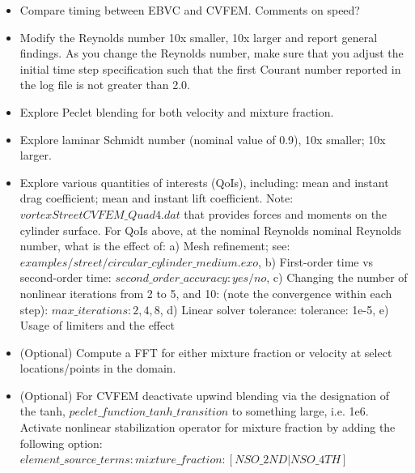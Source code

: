 \documentclass{article}
\begin{document}
\begin{itemize}
	\item Compare timing between EBVC and CVFEM. Comments on speed?
        \item Modify the Reynolds number 10x smaller, 10x larger and report general findings. 
          As you change the Reynolds number, make sure that you adjust the initial time step 
          specification such that the first Courant number reported in the log file is not greater 
          than 2.0.
        \item Explore Peclet blending for both velocity and mixture fraction.
        \item Explore laminar Schmidt number (nominal value of 0.9), 10x smaller; 10x larger.
        \item Explore various quantities of interests (QoIs), including: mean and instant drag 
          coefficient; mean and instant lift coefficient. 
        \subitem Note: $vortexStreetCVFEM\_Quad4.dat$ 
          that provides forces and moments on the cylinder surface. For QoIs above, at the nominal 
          Reynolds nominal Reynolds number, what is the effect of: a) Mesh refinement; see: 
          $examples/street/circular\_cylinder\_medium.exo$, b) First-order time vs second-order time: 
          $second\_order\_accuracy: yes/no$, c) Changing the number of nonlinear iterations from 2 to 5, 
          and 10: (note the convergence within each step): $max\_iterations: 2, 4, 8$, d) Linear solver 
          tolerance: tolerance: 1e-5, e) Usage of limiters and the effect
        \item (Optional) Compute a FFT for either mixture fraction or velocity at select locations/points in the domain. 
        \item (Optional) For CVFEM deactivate upwind blending via the designation of the tanh, 
          $peclet\_function\_tanh\_transition$ to something large, i.e. 1e6. 
          Activate nonlinear stabilization operator for mixture fraction by adding the following option: 
        \subitem $element\_source\_terms: mixture\_fraction: [NSO\_2ND|NSO\_4TH]$

\end{itemize}
\end{document}
